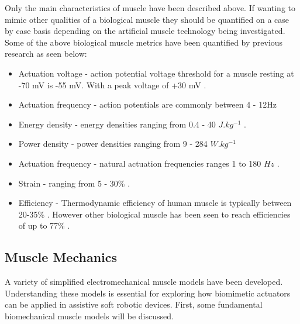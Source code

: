 Only the main characteristics of muscle have been described above. If wanting to mimic other qualities of a biological muscle they should be quantified on a case by case basis depending on the artificial muscle technology being investigated. Some of the above biological muscle metrics have been quantified by previous research as seen below:
\begin{itemize}
	\item Actuation voltage - action potential voltage threshold for a muscle resting at -70 mV is -55 mV. With a peak voltage of +30 mV \cite{Filatov2005,Schmidt-Nielsen2002}.
	\item Actuation frequency - action potentials are commonly between 4 - 12Hz \citep{Popovic2004}
    \item Energy density - energy densities ranging from 0.4 - 40 $J.kg^{-1}$ \citep{Alexander1977}.
    \item Power density - power densities ranging from 9 - 284 $W.kg^{-1}$ \citep{Full2004}
    \item Actuation frequency - natural actuation frequencies ranges 1 to 180 $Hz$ \citep{Full2004}.
    \item Strain - ranging from 5 - 30\% \citep{Duduta2019}.
    \item Efficiency - Thermodynamic efficiency of human muscle is typically between 20-35\% \citep{Smith2005}. However other biological muscle has been seen to reach efficiencies of up to 77\% \citep{Smith2005}.
\end{itemize}
    

\subsection{Muscle Mechanics}
A variety of simplified electromechanical muscle models have been developed. Understanding these models is essential for exploring how biomimetic actuators can be applied in assistive soft robotic devices. First, some fundamental biomechanical muscle models will be discussed.

